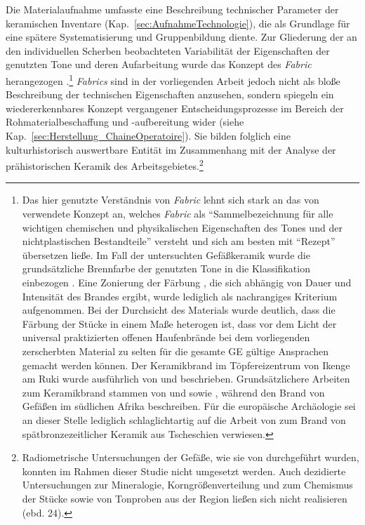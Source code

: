 \begin{multicols}{2}
Die Materialaufnahme umfasste eine Beschreibung technischer Parameter der keramischen Inventare (Kap.~\ref{sec:AufnahmeTechnologie}), die als Grundlage für eine spätere Systematisierung und Gruppenbildung diente. Zur Gliederung der an den individuellen Scherben beobachteten Variabilität der Eigenschaften der genutzten Tone und deren Aufarbeitung wurde das Konzept des \textit{Fabric} herangezogen \parencite[ebd. 49, 54--56][38--51]{Riemer.2011}.\footnote{Das hier genutzte Verständnis von \textit{Fabric} lehnt sich stark an das von \textcite[49]{Lange.2006} verwendete Konzept an, welches \textit{Fabric} als \enquote{Sammelbezeichnung für alle wichtigen chemischen und physikalischen Eigenschaften des Tones und der nichtplastischen Bestandteile} versteht und sich am besten mit \enquote{Rezept} übersetzen ließe. Im Fall der untersuchten Gefäßkeramik wurde die grundsätzliche Brennfarbe der genutzten Tone in die Klassifikation einbezogen \parencite[siehe][34]{Nordstrom.1972}. Eine Zonierung der Färbung \parencite[siehe][90 Abb.~4-1]{Clist.20042005}, die sich abhängig von Dauer und Intensität des Brandes ergibt, wurde lediglich als nachrangiges Kriterium aufgenommen. Bei der Durchsicht des Materials wurde deutlich, dass die Färbung der Stücke in einem Maße heterogen ist, dass vor dem Licht der universal praktizierten offenen Haufenbrände \parencite[siehe][217 Karte~17]{Drost.1967} bei dem vorliegenden zerscherbten Material zu selten für die gesamte GE gültige Ansprachen gemacht werden können. Der Keramikbrand im Töpfereizentrum von Ikenge am Ruki wurde ausführlich von \textcite[402--404; 422\,f. Abb.~16--18]{Eggert.1980c} und \textcite{Wotzka.1991} beschrieben. Grundsätzlichere Arbeiten zum Keramikbrand stammen von \textcite{Gosselain.1992b} und \textcite{LivingstoneSmith.2001} sowie \textcite{LundRasmussen.2012}, während \textcite[146 Abb.~17]{Lindahl.2010} den Brand von Gefäßen im südlichen Afrika beschreiben. Für die europäische Archäologie sei an dieser Stelle lediglich schlaglichtartig auf die Arbeit von \textcite{Ther.2011} zum Brand von spätbronzezeitlicher Keramik aus Tscheschien verwiesen.\label{ftn:Keramikbrand}} \textit{Fabrics} sind in der vorliegenden Arbeit jedoch nicht als bloße Beschreibung der technischen Eigenschaften anzusehen, sondern spiegeln ein wiedererkennbares Konzept vergangener Entscheidungsprozesse im Bereich der Rohmaterialbeschaffung und -aufbereitung wider (siehe Kap.~\ref{sec:Herstellung_ChaineOperatoire}). Sie bilden folglich eine kulturhistorisch auswertbare Entität im Zusammenhang mit der Analyse der prähistorischen Keramik des Arbeitsgebietes.\footnote{Radiometrische Untersuchungen der Gefäße, wie sie von \textcites{LivingstoneSmith.2007d}{LivingstoneSmith.2010c} durchgeführt wurden, konnten im Rahmen dieser Studie nicht umgesetzt werden. Auch dezidierte Untersuchungen zur Mineralogie, Korngrößenverteilung und zum Chemismus der Stücke sowie von Tonproben aus der Region ließen sich nicht realisieren (ebd. 24).}


\end{multicols}
